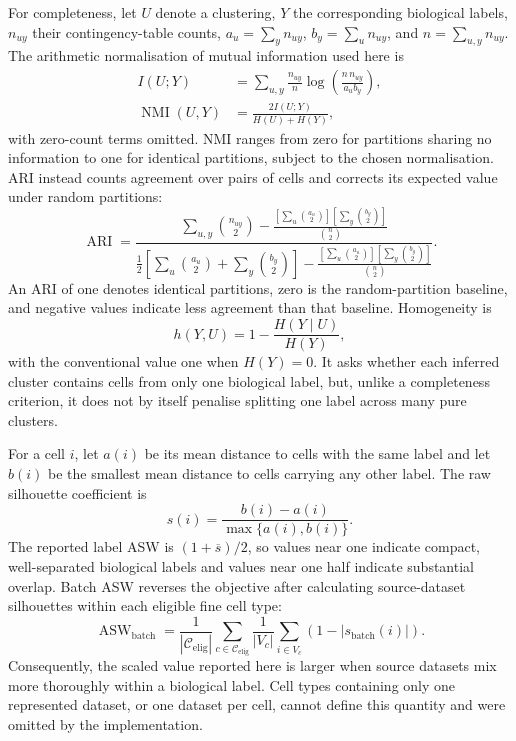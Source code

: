 \documentclass[11pt]{article}
\begin{document}
For completeness, let \(U\) denote a clustering, \(Y\) the corresponding biological labels, \(n_{uy}\) their contingency-table counts, \(a_u=\sum_y n_{uy}\), \(b_y=\sum_u n_{uy}\), and \(n=\sum_{u,y}n_{uy}\).
The arithmetic normalisation of mutual information used here is
\begin{align}
I(U;Y) &= \sum_{u,y}\frac{n_{uy}}{n}
\log\!\left(\frac{n\,n_{uy}}{a_u b_y}\right), \\
\operatorname{NMI}(U,Y) &= \frac{2I(U;Y)}{H(U)+H(Y)},
\end{align}
with zero-count terms omitted.
NMI ranges from zero for partitions sharing no information to one for identical partitions, subject to the chosen normalisation.
ARI instead counts agreement over pairs of cells and corrects its expected value under random partitions:
\begin{equation}
\operatorname{ARI}
=\frac{
\displaystyle\sum_{u,y}\binom{n_{uy}}{2}
-\displaystyle\frac{\left[\sum_u\binom{a_u}{2}\right]
\left[\sum_y\binom{b_y}{2}\right]}{\binom{n}{2}}
}{
\displaystyle\frac{1}{2}\left[
\sum_u\binom{a_u}{2}+\sum_y\binom{b_y}{2}
\right]
-\displaystyle\frac{\left[\sum_u\binom{a_u}{2}\right]
\left[\sum_y\binom{b_y}{2}\right]}{\binom{n}{2}}
}.
\end{equation}
An ARI of one denotes identical partitions, zero is the random-partition baseline, and negative values indicate less agreement than that baseline.
Homogeneity is
\begin{equation}
h(Y,U)=1-\frac{H(Y\mid U)}{H(Y)},
\end{equation}
with the conventional value one when \(H(Y)=0\).
It asks whether each inferred cluster contains cells from only one biological label, but, unlike a completeness criterion, it does not by itself penalise splitting one label across many pure clusters.

For a cell \(i\), let \(a(i)\) be its mean distance to cells with the same label and let \(b(i)\) be the smallest mean distance to cells carrying any other label.
The raw silhouette coefficient is
\begin{equation}
s(i)=\frac{b(i)-a(i)}{\max\{a(i),b(i)\}}.
\end{equation}
The reported label ASW is \((1+\overline{s})/2\), so values near one indicate compact, well-separated biological labels and values near one half indicate substantial overlap.
Batch ASW reverses the objective after calculating source-dataset silhouettes within each eligible fine cell type:
\begin{equation}
\operatorname{ASW}_{\mathrm{batch}}
=\frac{1}{|\mathcal{C}_{\mathrm{elig}}|}
\sum_{c\in\mathcal{C}_{\mathrm{elig}}}
\frac{1}{|V_c|}\sum_{i\in V_c}\left(1-|s_{\mathrm{batch}}(i)|\right).
\end{equation}
Consequently, the scaled value reported here is larger when source datasets mix more thoroughly within a biological label.
Cell types containing only one represented dataset, or one dataset per cell, cannot define this quantity and were omitted by the implementation.
\end{document}
